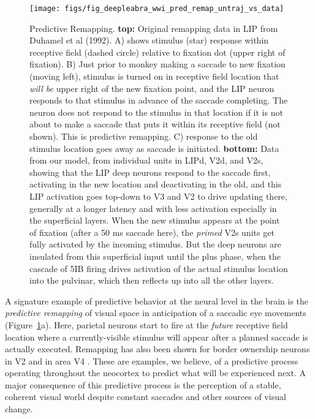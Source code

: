 \documentclass[11pt,twoside]{article}
\newif\myifpdf
\begin{document}
\begin{figure}
  \centering\texttt{[image: figs/fig\_deepleabra\_wwi\_pred\_remap\_untraj\_vs\_data]}
  \caption{\footnotesize Predictive Remapping.  {\bf top:} Original remapping data in LIP from Duhamel et al (1992).  A) shows stimulus (star) response within receptive field (dashed circle) relative to fixation dot (upper right of fixation).  B) Just prior to monkey making a saccade to new fixation (moving left), stimulus is turned on in receptive field location that {\em will be} upper right of the new fixation point, and the LIP neuron responds to that stimulus in advance of the saccade completing.  The neuron does not respond to the stimulus in that location if it is not about to make a saccade that puts it within its receptive field (not shown).  This is predictive remapping.  C) response to the old stimulus location goes away as saccade is initiated.  {\bf bottom:} Data from our model, from individual units in LIPd, V2d, and V2s, showing that the LIP deep neurons respond to the saccade first, activating in the new location and deactivating in the old, and this LIP activation goes top-down to V3 and V2 to drive updating there, generally at a longer latency and with less activation especially in the superficial layers.  When the new stimulus appears at the point of fixation (after a 50 ms saccade here), the {\em primed} V2s units get fully activated by the incoming stimulus.  But the deep neurons are insulated from this superficial input until the plus phase, when the cascade of 5IB firing drives activation of the actual stimulus location into the pulvinar, which then reflects up into all the other layers.}
  \label{fig.remap_units}
\end{figure}

A signature example of predictive behavior at the neural level in the brain is the {\em predictive remapping} of visual space in anticipation of a saccadic eye movements \citep{DuhamelColbyGoldberg92,ColbyDuhamelGoldberg97,GottliebKusunokiGoldberg98,NakamuraColby02,MarinoMazer16} (Figure~\ref{fig.remap_units}a).  Here, parietal neurons start to fire at the {\em future} receptive field location where a currently-visible stimulus will appear after a planned saccade is actually executed. Remapping has also been shown for border ownership neurons in V2 \citep{OHerronHeydt13} and in area V4 \citep{NeupaneGuittonPack16,NeupaneGuittonPack20}. These are examples, we believe, of a predictive process operating throughout the neocortex to predict what will be experienced next.  A major consequence of this predictive process is the perception of a stable, coherent visual world despite constant saccades and other sources of visual change.
\end{document}
